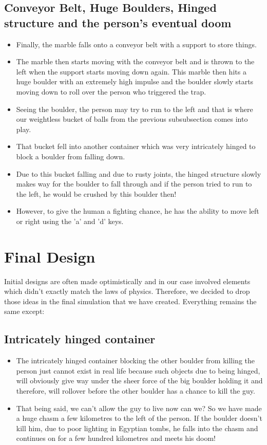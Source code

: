 \documentclass[11pt]{article}
\begin{document}
\subsection{Conveyor Belt, Huge Boulders, Hinged structure and the person's eventual doom}
\begin{itemize}
	\item Finally, the marble falls onto a conveyor belt with a support to store things. 
	\item The marble then starts moving with the conveyor belt and is thrown to the left when the support starts moving down again. This marble then hits a huge boulder with an extremely high impulse and the boulder slowly starts moving down to roll over the person who triggered the trap. 
	\item Seeing the boulder, the person may try to run to the left and that is where our weightless bucket of balls from the previous subsubsection comes into play.
	\item That bucket fell into another container which was very intricately hinged to block a boulder from falling down.
	\item Due to this bucket falling and due to rusty joints, the hinged structure slowly makes way for the boulder to fall through and if the person tried to run to the left, he would be crushed by this boulder then!
	\item However, to give the human a fighting chance, he has the ability to move left or right using the 'a' and 'd' keys.
\end{itemize}


\section{Final Design}
Initial designs are often made optimistically and in our case involved elements which didn't exactly match the laws of physics. Therefore, we decided to drop those ideas in the final simulation that we have created. Everything remains the same except:
\subsection{Intricately hinged container}
\begin{itemize}
\item The intricately hinged container blocking the other boulder from killing the person just cannot exist in real life because such objects due to being hinged, will obviously give way under the sheer force of the big boulder holding it and therefore, will rollover before the other boulder has a chance to kill the guy. 
\item That being said, we can't allow the guy to live now can we? So we have made a huge chasm a few kilometres to the left of the person. If the boulder doesn't kill him, due to poor lighting in Egyptian tombs, he falls into the chasm and continues on for a few hundred kilometres and meets his doom! 
\end{itemize}
\end{document}
